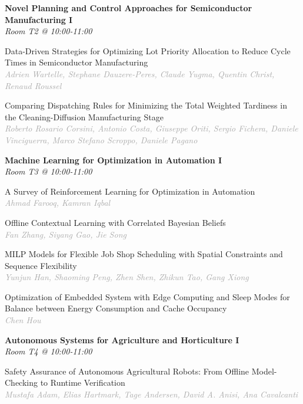 \begin{multicols*}{2}
\normalsize \textbf{Novel Planning and Control Approaches for Semiconductor Manufacturing I}\\
\small \textit{Room T2 @ 10:00-11:00}

\small Data-Driven Strategies for Optimizing Lot Priority Allocation to Reduce Cycle Times in Semiconductor Manufacturing\\ 
\footnotesize \textcolor{darkgray}{\textit{Adrien Wartelle, Stephane  Dauzere-Peres, Claude  Yugma, Quentin  Christ, Renaud  Roussel}}

\small Comparing Dispatching Rules for Minimizing the Total Weighted Tardiness in the Cleaning-Diffusion Manufacturing Stage\\ 
\footnotesize \textcolor{darkgray}{\textit{Roberto Rosario Corsini, Antonio  Costa, Giuseppe  Oriti, Sergio  Fichera, Daniele  Vinciguerra, Marco Stefano  Scroppo, Daniele  Pagano}}

\normalsize \textbf{Machine Learning for Optimization in Automation I}\\
\small \textit{Room T3 @ 10:00-11:00}

\small A Survey of Reinforcement Learning for Optimization in Automation\\ 
\footnotesize \textcolor{darkgray}{\textit{Ahmad Farooq, Kamran  Iqbal}}

\small Offline Contextual Learning with Correlated Bayesian Beliefs\\ 
\footnotesize \textcolor{darkgray}{\textit{Fan Zhang, Siyang  Gao, Jie  Song}}

\small MILP Models for Flexible Job Shop Scheduling with Spatial Constraints and Sequence Flexibility\\ 
\footnotesize \textcolor{darkgray}{\textit{Yunjun Han, Shaoming  Peng, Zhen  Shen, Zhikun  Tao, Gang  Xiong}}

\small Optimization of Embedded System with Edge Computing and Sleep Modes for Balance between Energy Consumption and Cache Occupancy\\ 
\footnotesize \textcolor{darkgray}{\textit{Chen Hou}}

\normalsize \textbf{Autonomous Systems for Agriculture and Horticulture I}\\
\small \textit{Room T4 @ 10:00-11:00}

\small Safety Assurance of Autonomous Agricultural Robots: From Offline Model-Checking to Runtime Verification\\ 
\footnotesize \textcolor{darkgray}{\textit{Mustafa Adam, Elias  Hartmark, Tage  Andersen, David A.  Anisi, Ana  Cavalcanti}}


\end{multicols*}
